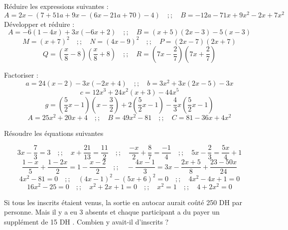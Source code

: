 \documentclass[a4paper,addpoints,12pt]{exam}
\begin{document}
\devoir[sem=2,prv=false,ds=false,num=4 ,niv=2 , date=23/02/2023,Rdate=27/02/2023]

\begin{exo}
\begin{questions}
\question Réduire les expressions suivantes :
\[
A=2x-\left(7+51a+9x-\left(6x-21a+70\right)-4\right)\quad ;; \quad
B=-12a-71x+9x^{2}-2x+7x^{2}
\]
\question Développer et réduire :
\[
A=-6\left(1-4x\right)+3x\left(-6x+2\right)\quad ;; \quad
B=\left(x+5\right)\left(2x-3\right)-5\left(x-3\right)
\]
\[
M=\left(x+7\right)^{2}\quad ;; \quad
N=\left(4x-9\right)^{2}\quad ;; \quad
P=\left(2x-7\right)\left(2x+7\right)
\]
\[
Q=\left(\dfrac{x}{8}-8\right)\left(\dfrac{x}{8}+8\right)\quad ;; \quad
R=\left(7x-\dfrac{2}{7}\right)\left(7x+\dfrac{2}{7}\right)
\]
\end{questions}
\end{exo}

\begin{exo}
\begin{questions}
\question Factoriser :
\[
a=24\left(x-2\right)-3x\left(-2x+4\right)\quad ;; \quad
b=3x^{2}+3x\left(2x-5\right)-3x
\]
\[
c=12x^{3}+24x^{2}\left(x+3\right)-44x^{5}
\]
\[
g=\left(\dfrac{5}{2}x-1\right)\left(x-\dfrac{3}{2}\right)+2\left(\dfrac{5}{2}x-1\right)-\dfrac{4}{3}x\left(\dfrac{5}{2}x-1\right)
\]
\[
A=25x^{2}+20x+4\quad ;; \quad
B=49x^{2}-81\quad ;; \quad
C=81-36x+4x^{2}
\]
\end{questions}
\end{exo}

\begin{exo}
\begin{questions}
\question Résoudre les équations suivantes 
\end{questions}
\[
3x-\dfrac{7}{3}=3\quad ;; \quad
x+\dfrac{21}{13}=\dfrac{11}{2}\quad ;; \quad
\dfrac{-x}{2}+\dfrac{8}{7}=\dfrac{-1}{4}\quad ;; \quad
5x-\dfrac{2}{3}=\dfrac{5x}{4}+1
\]
\[
\dfrac{1-x}{5}+\dfrac{1-2x}{2}=1-\dfrac{x-2}{2}\quad ;; \quad
-\dfrac{4x-1}{3}=3x-\dfrac{2x+5}{8}+\dfrac{23-50x}{24}
\]
\[
4x^{2}-81=0 \quad ;; \quad
\left(4x-1\right)^{2}-(5x+6)^{2}=0\quad ;; \quad
4x^{2}-4x+1=0
\]
\[
16x^{2}-25=0\quad ;; \quad
x^{2}+2x+1=0\quad ;; \quad
x^{2}=1\quad ;; \quad
4+2x^{2}=0
\]
\end{exo}

\begin{exo}
Si tous les inscrits étaient venus, la sortie en autocar aurait coûté 250 DH par personne. Mais il y a eu 3 absents et chaque participant a du payer un supplément de 15 DH . Combien y avait-il d'inscrits ?
\end{exo}
\end{document}
